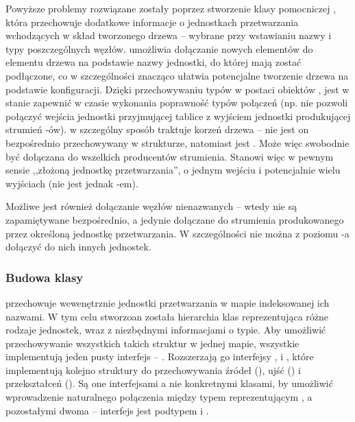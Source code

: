 Powyższe problemy rozwiązane zostały poprzez stworzenie klasy pomocniczej , która
przechowuje dodatkowe informacje o jednostkach przetwarzania wchodzących w skład tworzonego drzewa
-- wybrane przy wstawianiu nazwy i typy poszczególnych węzłów.  umożliwia dołączanie
nowych elementów do elementu drzewa na podstawie nazwy jednostki, do której mają zostać podłączone,
co w szczególności znacząco ułatwia potencjalne tworzenie drzewa na podstawie konfiguracji. Dzięki
przechowywaniu typów w postaci obiektów ,  jest w stanie zapewnić w
czasie wykonania poprawność typów połączeń (np. nie pozwoli połączyć wejścia jednostki przyjmującej
tablice  z wyjściem jednostki produkującej strumień -ów).  w
szczególny sposób traktuje korzeń drzewa -- nie jest on bezpośrednio przechowywany w strukturze,
natomiast  jest . Może więc swobodnie być dołączana do wszelkich
producentów strumienia. Stanowi więc w pewnym sensie ,,złożoną jednostkę przetwarzania'', o jednym
wejściu i potencjalnie wielu wyjściach (nie jest jednak -em).

\begin{Note}
  Możliwe jest również dołączanie węzłów nienazwanych -- wtedy nie są zapamiętywane bezpośrednio, a
  jedynie dołączane do strumienia produkowanego przez określoną jednostkę przetwarzania. W
  szczególności nie można z poziomu -a dołączyć do nich innych jednostek.
\end{Note}


\subsubsection{Budowa klasy }

 przechowuje wewenętrznie jednostki przetwarzania w mapie indeksowanej ich nazwami. W
tym celu stworzoan została hierarchia klas reprezentująca różne rodzaje jednostek, wraz z
niezbędnymi informacjami o typie. Aby umożliwić przechowywanie wszystkich takich struktur w jednej
mapie, wszystkie implementują jeden pusty interfejs -- . Rozszerzają go interfejsy
,  i , które implementują kolejno struktury do
przechowywania źródeł (), ujść () i przekształceń
(). Są one interfejsami a nie konkretnymi klasami, by umożliwić wprowadzenie
naturalnego połączenia między typem reprezentującym , a pozostałymi dwoma --
interfejs  jest podtypem  i . 

